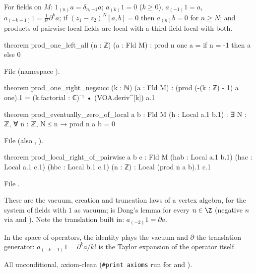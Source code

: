 \begin{theorem}\label{l03:thm:fldlaws}
For fields on $M$: $1_{(n)}a = \delta_{n,-1}a$; $a_{(k)}1 = 0$ ($k\ge0$), $a_{(-1)}1 = a$,
$a_{(-k-1)}1 = \frac1{k!}\partial^ka$; if $(z_1-z_2)^N[a,b] = 0$ then $a_{(n)}b = 0$ for $n\ge N$; and
products of pairwise local fields are local with a third field local with both.
\end{theorem}
\begin{leancode}
theorem prod_one_left_all (n : ℤ) (a : Fld M) :
    prod n one a = if n = -1 then a else 0
\end{leancode}
File  (namespace ).
\begin{leancode}
theorem prod_one_right_negsucc (k : ℕ) (a : Fld M) :
    (prod (-(k : ℤ) - 1) a one).1 =
      (k.factorial : ℂ)⁻¹ • (VOA.deriv^[k]) a.1

theorem prod_eventually_zero_of_local {a b : Fld M} (h : Local a.1 b.1) :
    ∃ N : ℤ, ∀ n : ℤ, N ≤ n → prod n a b = 0
\end{leancode}
File  (also ,
).
\begin{leancode}
theorem prod_local_right_of_pairwise {a b c : Fld M}
    (hab : Local a.1 b.1) (hac : Local a.1 c.1) (hbc : Local b.1 c.1) (n : ℤ) :
    Local (prod n a b).1 c.1
\end{leancode}
File .

\begin{dictionary}
These are the vacuum, creation and truncation laws of a vertex algebra, for the system of fields with
$1$ as vacuum;  is Dong's lemma for every $n\in\Z$ (negative $n$ via
 and ). Note the translation built in:
$a_{(-2)}1 = \partial a$.
\end{dictionary}

\begin{physics}
In the space of operators, the identity plays the vacuum and $\partial$ the translation generator:
$a_{(-k-1)}1 = \partial^ka/k!$ is the Taylor expansion of the operator itself.
\end{physics}

\begin{status}
All unconditional, axiom-clean (\texttt{\#print axioms} run for
 and ).
\end{status}

